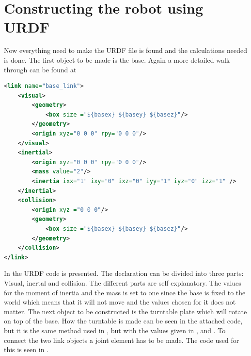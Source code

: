 \section{Constructing the robot using URDF}\label{sec:makingurdf}
Now everything need to make the URDF file is found and the calculations needed is done. The first object to be made is the base. Again a more detailed walk through can be found at \cite{ROSWiki,GazeboURDF}\\
\begin{lstlisting}[language=xml,caption={Base},label={lst:base}]
<link name="base_link">
    <visual>
        <geometry>
            <box size ="${basex} ${basey} ${basez}"/>
        </geometry>
        <origin xyz="0 0 0" rpy="0 0 0"/>
    </visual>
    <inertial>
        <origin xyz="0 0 0" rpy="0 0 0"/>
        <mass value="2"/>
        <inertia ixx="1" ixy="0" ixz="0" iyy="1" iyz="0" izz="1" />
    </inertial>
    <collision>
        <origin xyz ="0 0 0"/>
        <geometry>
            <box size ="${basex} ${basey} ${basez}"/>
        </geometry>
    </collision>
</link>
\end{lstlisting}
In  the URDF code is presented. The declaration can be divided into three parts: Visual, inertal and collision. The different parts are self explanatory. The values for the moment of inertia and the mass is set to one since the base is fixed to the world which means that it will not move and the values chosen for it does not matter. The next object to be constructed is the turntable plate which will rotate on top of the base. How the turntable is made can be seen in the attached code, but it is the same method used in , but with the values given in ,  and . To connect the two link objects a joint element has to be made. The code used for this is seen in .


